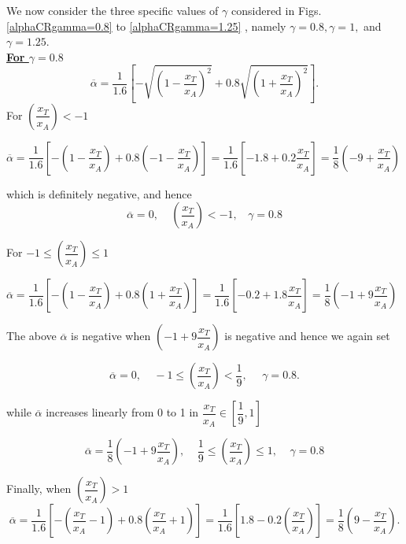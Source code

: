 We now consider the three specific values of $\gamma$ considered in Figs. \ref{alphaCRgamma=0.8} to \ref{alphaCRgamma=1.25} , namely $\gamma=0.8, \gamma=1,$ and $\gamma=1.25$.\\


\underline{\textbf{For $\gamma=0.8$}}
\begin{equation}
\overline{\alpha}= \dfrac{1}{1.6} [- \sqrt{(1-\dfrac{x_T}{x_A})^2}+ 0.8 \sqrt{(1+\dfrac{x_T}{x_A})^2}].
\end{equation}
For $(\dfrac{x_T}{x_A})<-1$\\

\begin{center}
$\overline{\alpha}=\dfrac{1}{1.6}[-(1-\dfrac{x_T}{x_A})+ 0.8(-1-\dfrac{x_T}{x_A})]
=\dfrac{1}{1.6}[-1.8+0.2\dfrac{x_T}{x_A}]=\dfrac{1}{8}(-9+\dfrac{x_T}{x_A})$
\end{center}

which is definitely negative, and hence
\begin{equation}
\overline{\alpha}=0,\ \ \ \ \ (\dfrac{x_T}{x_A})<-1, \ \ \ \ \gamma=0.8
\end{equation}

For $-1\leq (\dfrac{x_T}{x_A})\leq 1$\\
\begin{center}
$\overline{\alpha}=\dfrac{1}{1.6}[-(1-\dfrac{x_T}{x_A})+0.8(1+\dfrac{x_T}{x_A})]= \dfrac{1}{1.6}[-0.2+1.8 \dfrac{x_T}{x_A}]= \dfrac{1}{8}(-1+9\dfrac{x_T}{x_A})$
\end{center}
The above $\overline{\alpha}$ is negative when $(-1+9 \dfrac{x_T}{x_A})$ is negative and hence we again set

\begin{equation}
\overline{\alpha}=0, \ \ \ \ \ -1\leq(\dfrac{x_T}{x_A})<\dfrac{1}{9}, \ \ \ \ \ \ \gamma=0.8.
\end{equation}

while $\overline{\alpha}$ increases linearly from 0 to 1 in $\dfrac{x_T}{x_A}\in [\dfrac{1}{9},1]$

\begin{equation}
\overline{\alpha} = \dfrac{1}{8} (-1 + 9 \dfrac{x_T}{x_A}), \ \ \ \ \ \dfrac{1}{9}\leq (\dfrac{x_T}{x_A})\leq 1, \ \ \ \ \ \gamma=0.8
\end{equation}

Finally, when $(\dfrac{x_T}{x_A})>1$
\begin{equation}
\overline{\alpha}= \dfrac{1}{1.6} [-(\dfrac{x_T}{x_A}-1)+ 0.8 (\dfrac{x_T}{x_A}+1)]
=\dfrac{1}{1.6}[1.8 - 0.2 (\dfrac{x_T}{x_A})]
=\dfrac{1}{8} (9-\dfrac{x_T}{x_A}).
\end{equation}

